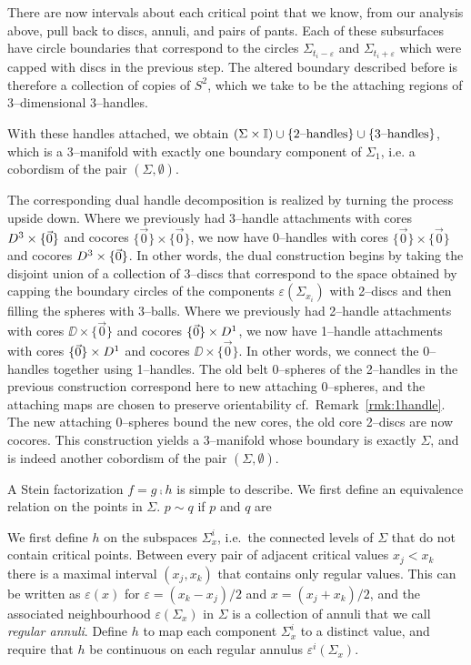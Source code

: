 There are now intervals about each critical point that we know, from our analysis above, pull back to discs, annuli, and pairs of pants.
Each of these subsurfaces have circle boundaries that correspond to the circles $\Sigma_{t_i-\varepsilon}$ and $\Sigma_{t_i+\varepsilon}$ which were capped with discs in the previous step.
The altered boundary described before is therefore a collection of copies of $S^2$, which we take to be the attaching regions of 3--dimensional 3--handles.

With these handles attached, we obtain $(\Sigma\times\mathbb{I})\cup\{\textrm{2--handles}\}\cup\{\textrm{3--handles}\}$, which is a 3--manifold with exactly one boundary component of $\Sigma_1$, i.e. a cobordism of the pair $(\Sigma,\emptyset)$.

The corresponding dual handle decomposition is realized by turning the process upside down.
Where we previously had 3--handle attachments with cores $D^3\times\{\vec{0}\}$ and cocores $\{\vec{0}\}\times\{\vec{0}\}$, we now have 0--handles with cores $\{\vec{0}\}\times\{\vec{0}\}$ and cocores $D^3\times\{\vec{0}\}$.
In other words, the dual construction begins by taking the disjoint union of a collection of 3--discs that correspond to the space obtained by capping the boundary circles of the components $\varepsilon(\Sigma_{x_i})$ with 2--discs and then filling the spheres with 3--balls.
Where we previously had 2--handle attachments with cores $\DD\times\{\vec{0}\}$ and cocores $\{\vec{0}\}\times D^1$, we now have 1--handle attachments with cores $\{\vec{0}\}\times D^1$ and cocores $\DD\times\{\vec{0}\}$.
In other words, we connect the 0--handles together using 1--handles.
The old belt 0--spheres of the 2--handles in the previous construction correspond here to new attaching 0--spheres, and the attaching maps are chosen to preserve orientability cf.\ Remark~\ref{rmk:1handle}.
The new attaching 0--spheres bound the new cores, the old core 2--discs are now cocores.
This construction yields a 3--manifold whose boundary is exactly $\Sigma$, and is indeed another cobordism of the pair $(\Sigma,\emptyset)$.



A Stein factorization $f=g\comp h$ is simple to describe.
We first define an equivalence relation on the points in $\Sigma$.
 $p\sim q$ if $p$ and $q$ are 

We first define $h$ on the subspaces $\Sigma_x^i$, i.e.\ the connected levels of $\Sigma$ that do not contain critical points.
Between every pair of adjacent critical values $x_j < x_k$ there is a maximal interval $(x_j,x_k)$ that contains only regular values.
This can be written as $\varepsilon(x)$ for $\varepsilon=(x_k-x_j)/2$ and $x=(x_j+x_k)/2$, and the associated neighbourhood $\varepsilon(\Sigma_x)$ in $\Sigma$ is a collection of annuli that we call \emph{regular annuli}.
Define $h$ to map each component $\Sigma_x^i$ to a distinct value, and require that $h$ be continuous on each regular annulus $\varepsilon^i(\Sigma_x)$.

